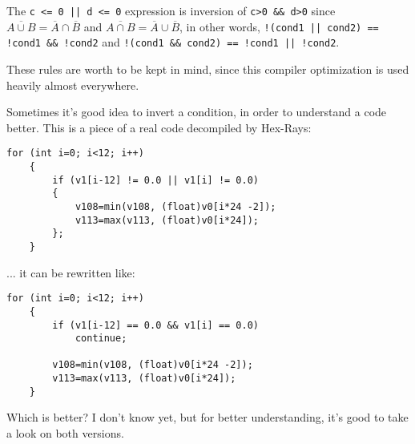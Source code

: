 The \verb~c <= 0 || d <= 0~ expression is inversion of \verb|c>0 && d>0| since 
$\overline{A \cup B} = \overline{A} \cap \overline{B}$ and
$\overline{A \cap B} = \overline{A} \cup \overline{B}$,
in other words,
\verb~!(cond1 || cond2) == !cond1 && !cond2~ and \verb~!(cond1 && cond2) == !cond1 || !cond2~.

These rules are worth to be kept in mind, since this compiler optimization is used heavily almost everywhere.

Sometimes it's good idea to invert a condition, in order to understand a code better.
This is a piece of a real code decompiled by Hex-Rays:

\begin{lstlisting}[style=customc]
	for (int i=0; i<12; i++)
	{
		if (v1[i-12] != 0.0 || v1[i] != 0.0)
		{
			v108=min(v108, (float)v0[i*24 -2]);
			v113=max(v113, (float)v0[i*24]);
		};
	}
\end{lstlisting}

... it can be rewritten like:

\begin{lstlisting}[style=customc]
	for (int i=0; i<12; i++)
	{
		if (v1[i-12] == 0.0 && v1[i] == 0.0)
			continue;

		v108=min(v108, (float)v0[i*24 -2]);
		v113=max(v113, (float)v0[i*24]);
	}
\end{lstlisting}

Which is better? I don't know yet, but for better understanding, it's good to take a look on both versions.

